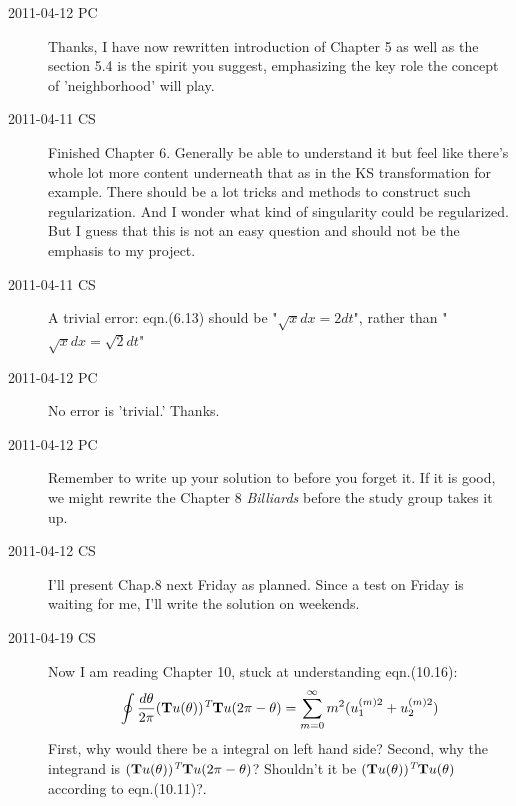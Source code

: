 \begin{description}


\item[2011-04-12 PC] Thanks, I have now rewritten introduction of
Chapter 5 as well as the section 5.4 is the spirit you suggest,
emphasizing the key role the concept of 'neighborhood' will play.

\item[2011-04-11 CS]
Finished Chapter 6. Generally be able to understand it but feel like
there's whole lot more content underneath that as in the KS
transformation for example. There should be a lot tricks and methods to
construct such regularization. And I wonder what kind of singularity
could be regularized. But I guess that this is not an easy question and
should not be the emphasis to my project.


\item[2011-04-11 CS]
A trivial error: eqn.(6.13) should be "$\sqrt{x}dx = 2dt$",
rather than "$\sqrt{x}dx = \sqrt{2}dt$"

\item[2011-04-12 PC]
No error is 'trivial.' Thanks.

\item[2011-04-12 PC] Remember to write up your solution to
 before you forget it. If it is good, we might
rewrite the Chapter 8 {\em Billiards} before the study group takes it up.

\item[2011-04-12 CS] I'll present Chap.8 next Friday as planned. Since a
test on Friday is waiting for me, I'll write the solution on weekends.

\item[2011-04-19 CS] Now I am reading Chapter 10, stuck at understanding eqn.(10.16):
\[
\oint\frac{d\theta}{2\pi}(\textbf{T}u(\theta))^{\emph{T}}\textbf{T}u(2\pi-\theta)
 = \sum\limits_{m=0}^{\infty}m^{2}(u_{1}^{(m)2}+u_{2}^{(m)2})
\]
First, why would there be a integral on left hand side?
Second, why the integrand is $(\textbf{T}u(\theta))^{\emph{T}}\textbf{T}u(2\pi-\theta)$? Shouldn't it be
 $(\textbf{T}u(\theta))^{\emph{T}}\textbf{T}u(\theta)$ according to eqn.(10.11)?.


\end{description}
